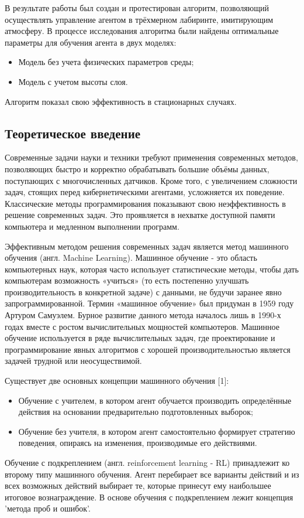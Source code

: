 \documentclass[a4paper]{report}
\theoremstyle{definition}
\theoremstyle{plain}
\theoremstyle{remark}
\theoremstyle{remark}
\theoremstyle{definition}
\begin{document}
В результате работы был создан и протестирован алгоритм, позволяющий осуществлять управление агентом в трёхмерном лабиринте, имитирующим атмосферу. В процессе исследования алгоритма были найдены оптимальные параметры для обучения агента в двух моделях:
\begin{itemize}
    \item Модель без учета физических параметров среды;
    \item Модель с учетом высоты слоя.
\end{itemize}
Алгоритм показал свою эффективность в стационарных случаях.

\newpage
{}
\begin{center}
\section{Теоретическое введение}
\end{center}
\label{sec:W1}

Современные задачи науки и техники требуют применения современных методов, позволяющих быстро и корректно обрабатывать большие объёмы данных, поступающих с многочисленных датчиков. Кроме того, с увеличением сложности задач, стоящих перед кибернетическими агентами, усложняется их поведение. Классические методы программирования показывают свою неэффективность в решение современных задач. Это проявляется в нехватке доступной памяти компьютера и медленном выполнении программ.

Эффективным методом решения современных задач является метод машинного обучения (англ. Machine Learning). Машинное обучение - это область компьютерных наук, которая часто использует статистические методы, чтобы дать компьютерам возможность «учиться» (то есть постепенно улучшать производительность в конкретной задаче) с данными, не будучи заранее явно запрограммированной. Термин «машинное обучение» был придуман в 1959 году Артуром Самуэлем. 
Бурное развитие данного метода началось лишь в 1990-х годах вместе с ростом вычислительных мощностей компьютеров. Машинное обучение используется в ряде вычислительных задач, где проектирование и программирование явных алгоритмов с хорошей производительностью является задачей трудной или неосуществимой. 

Существует две основных концепции машинного обучения [1]: 
\begin{itemize}
    \item Обучение с учителем, в котором агент обучается производить определённые действия на основании предварительно подготовленных выборок;
    \item Обучение без учителя, в котором агент самостоятельно формирует стратегию поведения, опираясь на изменения, производимые его действиями.
\end{itemize}
Обучение с подкреплением (англ. reinforcement learning - RL) принадлежит ко второму типу машинного обучения. Агент перебирает все варианты действий и из всех возможных действий выбирает те, которые принесут ему наибольшее итоговое вознаграждение. В основе обучения с подкреплением лежит концепция 'метода проб и ошибок'.
\end{document}
